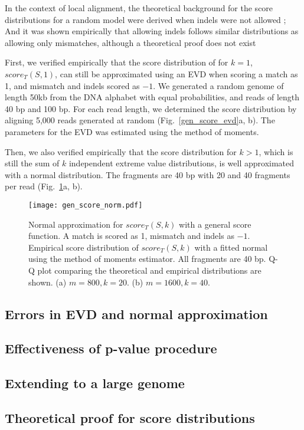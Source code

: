 In the context of local alignment, the theoretical background for the
score distributions for a random model were derived when indels were not
allowed \citep{}; And it was shown empirically that allowing indels
follows similar distributions as allowing only mismatches, although a
theoretical proof does not exist \citep{}

First, we verified empirically that the score distribution of for $k=1$,
$score_T(S,1)$, can still be approximated using an EVD when scoring a
match as 1, and mismatch and indels scored as $-1$. We generated a random
genome of length 50kb from the DNA alphabet with equal probabilities,
and reads of length 40 bp and 100 bp. For each read length, we
determined the score distribution by aligning 5,000 reads generated at
random (Fig.~\ref{gen_score_evd}a, b). The parameters for the EVD was
estimated using the method of moments.

Then, we also verified empirically that the score distribution for $k >
1$, which is still the sum of $k$ independent extreme value
distributions, is well approximated with a normal distribution. The
fragments are 40 bp with 20 and 40 fragments per read
(Fig.~\ref{gen_score_norm}a, b).

\begin{figure}[t!]
\centering
\texttt{[image: gen\_score\_norm.pdf]}
\caption[Normal approximation for $score_T(S,k)$ with a general score
  function]{
  Normal approximation for $score_T(S,k)$ with a general score function.
  A match is scored as 1, mismatch and indels as $-1$.
  Empirical score distribution of $score_T(S,k)$ with a fitted
  normal using the method of moments estimator. All fragments are 40 bp.
  Q-Q plot comparing the theoretical and empirical distributions are shown.
  (a) $m=800, k=20$.
  (b) $m=1600, k=40$.}
\label{gen_score_norm}
\end{figure}


\subsection*{Errors in EVD and normal approximation}

\subsection*{Effectiveness of p-value procedure}

\subsection*{Extending to a large genome}

\subsection*{Theoretical proof for score distributions}
